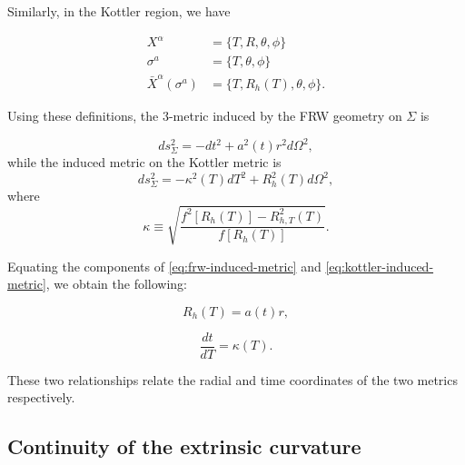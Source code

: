 Similarly, in the Kottler region, we have 

\begin{subequations}
  \begin{align}
    X^{\alpha} &= \{ T, R, \theta, \phi \} \\
    \sigma^a &= \{ T, \theta, \phi \} \\
    \bar{X}^{\alpha}(\sigma^a) &= \{ T, R_h(T), \theta, \phi\}.
  \end{align}
\end{subequations}

Using these definitions, the 3-metric induced by the FRW geometry on $\Sigma$ is

\begin{equation}
  ds^2_{\Sigma} = -dt^2 + a^2(t)r^2 d \Omega^2,
  \label{eq:frw-induced-metric}
\end{equation}
while the induced metric on the Kottler metric is
\begin{equation}
  ds_{\Sigma}^2 = -\kappa^2(T)dT^2 + R_h^2(T) d \Omega^2,
  \label{eq:kottler-induced-metric}
\end{equation}
where
\begin{equation}
  \kappa \equiv \sqrt{\frac{f^2[R_h(T)] - R_{h,T}^2(T)}{f[R_h(T)]}}.
  \label{eq:kottler-kappa}
\end{equation}

Equating the components of \autoref{eq:frw-induced-metric} and \autoref{eq:kottler-induced-metric}, we obtain the following:

\begin{equation}
  R_h(T) = a(t)r
  \label{eq:r-to-ar},
\end{equation}

\begin{equation}
  \frac{dt}{dT} = \kappa(T).
  \label{eq:dt-dT}
\end{equation}


These two relationships relate the radial and time coordinates of the two metrics respectively. 

\subsection{Continuity of the extrinsic curvature}

